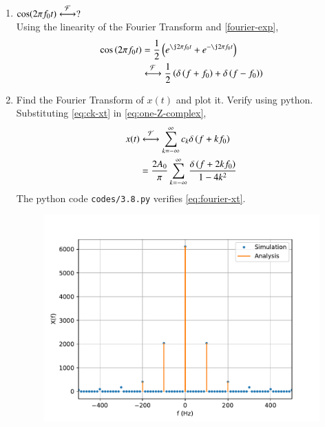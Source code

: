 \documentclass[journal,12pt,twocolumn]{IEEEtran}
\renewcommand\thesection{\arabic{section}}
\begin{document}
\begin{enumerate}[label=\thesection.\arabic*
,ref=\thesection.\theenumi]
\solution Suppose $g(t)\system{F}G(f)$. Then,
\begin{align}
g(t)e^{\j2\pi f_0t}&\system{F}\int_{-\infty}^{\infty}
g(t)e^{-\j2\pi\brak{f-f_0}t}\, dt \\
&=F(f-f_0)
\label{eq:f-shift}
\end{align}
Using \eqref{eq:duality} in \eqref{eq:fourier-delta}, $1\system{F}\delta(-f)$.
Hence, applying \eqref{eq:f-shift},
\begin{align}
e^{-\j2\pi f_0t}\system{F}\delta(-(f+f_0)) = \delta(f+f_0)
\label{eq:fourier-exp}
\end{align}
\item $\cos(2\pi f_0t)\overset{\mathcal{F}}{ \longleftrightarrow}?$ \\
\solution Using the linearity of the Fourier
Transform and \eqref{fourier-exp},
\begin{align}
\cos\brak{2\pi f_0t} &= \frac{1}{2}
\brak{e^{\j2\pi f_0t} + e^{-\j2\pi f_0t}} \\
&\system{F}\frac{1}{2}\brak{\delta\brak{f+f_0} + \delta\brak{f-f_0}}
\end{align}
\item Find the Fourier Transform of $x(t)$ and plot it. Verify using python. \\
\solution Substituting \eqref{eq:ck-xt} in \eqref{eq:one-Z-complex},
\begin{align}
x(t)&\overset{\mathcal{F}}{ \longleftrightarrow}\sum_{k=-\infty}^{\infty}c_k\delta\left(f+kf_0\right) \\
&=\frac{2A_0}{\pi}\sum_{k=-\infty}^{\infty}\frac{\delta\left(f+2kf_0\right)}{1-4k^2}
\label{eq:fourier-xt}
\end{align}
The python code \texttt{codes/3.8.py} verifies \eqref{eq:fourier-xt}.
\begin{figure}[!ht]
\includegraphics[width=\columnwidth]{figs/3.8.pdf}

\end{figure}
\end{enumerate}
\end{document}
